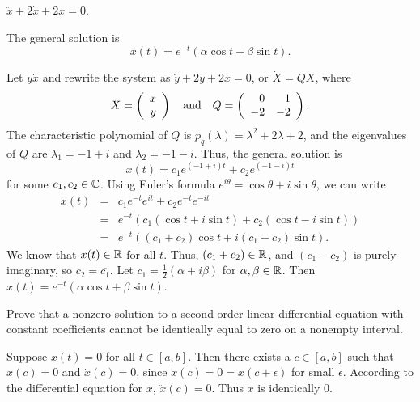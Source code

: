 \documentclass{ximera}
\begin{document}
\begin{exercise} \label{c6.6.hoc}
$\ddot{x} + 2\dot{x} + 2x = 0$.

\begin{solution}

\ans The general solution is
\[
x(t) = e^{-t}(\alpha \cos{t} + \beta \sin{t}).
\]

\soln Let $y \dot{x}$ and rewrite the system as $\dot{y} + 2y + 2x = 0$,
or $\dot{X} = QX$, where
\[
X = \left(\begin{array}{r} x \\ y\end{array}\right) \quad\mbox{and}\quad Q = \left(\begin{array}{rr} 0 & 1\\ -2 &-2\end{array}\right).
\]
The characteristic polynomial of $Q$ is $p_q(\lambda) = \lambda^2 
+ 2\lambda + 2$, and the eigenvalues of $Q$ are $\lambda_1 = -1 + i$ and
$\lambda_2 = -1 - i$.  Thus, the general solution is
\[
x(t) = c_1e^{(-1 + i)t} + c_2e^{(-1 - i)t}
\]
for some $c_1, c_2 \in \mbox{$\Bbb{C}$}$.  Using Euler's formula $e^{i\theta} =
\cos\theta + i\sin\theta$, we can write
\[
\begin{array}{rcl}
x(t) & = & c_1e^{-t}e^{it} + c_2e^{-t}e^{-it} \\
& = & e^{-t}(c_1(\cos{t} + i\sin{t}) + c_2(\cos{t} - i\sin{t})) \\
& = & e^{-t}((c_1 + c_2)\cos{t} + i(c_1 - c_2)\sin{t}).
\end{array}
\]
We know that $x(t) \in \mbox{$\Bbb{R}$}$ for all $t$.  Thus, $(c_1 + c_2) \in \mbox{$\Bbb{R}$}$, and
$(c_1 - c_2)$ is purely imaginary, so $c_2 = \overline{c_1}$.  Let
$c_1 = \frac{1}{2}(\alpha + i\beta)$ for $\alpha, \beta \in \mbox{$\Bbb{R}$}$. 
Then $x(t) = e^{-t}(\alpha\cos{t} + \beta\sin{t})$.

\end{solution}
\end{exercise}

\begin{exercise} \label{c6.7.3}
Prove that a nonzero solution to a second order linear differential equation
with constant coefficients cannot be identically equal to zero on a nonempty
interval.

\begin{solution}

Suppose $x(t) = 0$ for all $t \in [a,b]$.  Then there exists a 
$c \in [a,b]$ such that $x(c) = 0$ and $\dot{x}(c) = 0$, since $x(c) =
0 = x(c + \epsilon)$ for small $\epsilon$.  According to the differential
equation for $x$, $\ddot{x}(c) = 0$.  Thus $x$ is identically $0$.

\end{solution}
\end{exercise}
\end{document}
